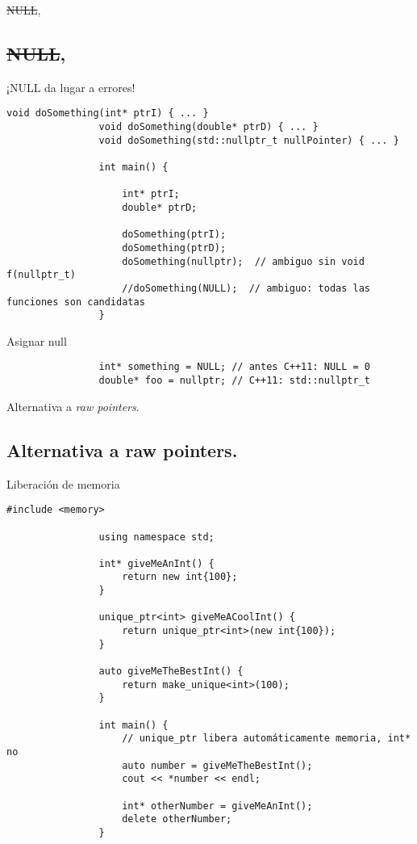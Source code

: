 \documentclass{beamer}
\newcommand{\normalSizeItem}[1] {
  \normalsize{\item #1}
}
\begin{document}
		\begin{frame}[fragile]{\sout{NULL}, }	
			\subsection{\sout{NULL}, }
			\begin{itemize}
			
				\normalSizeItem { ¡NULL da lugar a errores! }
				\begin{lstlisting}[basicstyle={\tiny\ttfamily}]
				void doSomething(int* ptrI) { ... }
				void doSomething(double* ptrD) { ... }
				void doSomething(std::nullptr_t nullPointer) { ... } 
				
				int main() {
				
					int* ptrI;
					double* ptrD;
				 
					doSomething(ptrI);
					doSomething(ptrD);
					doSomething(nullptr);  // ambiguo sin void f(nullptr_t)
					//doSomething(NULL);  // ambiguo: todas las funciones son candidatas
				}
				\end{lstlisting}
				
				\normalSizeItem { Asignar null}
				\begin{lstlisting}
				int* something = NULL; // antes C++11: NULL = 0
				double* foo = nullptr; // C++11: std::nullptr_t
				\end{lstlisting}
				
			\end{itemize}
		\end{frame}
		
		\begin{frame}[fragile]{Alternativa a \textit{raw pointers}. }	
			\subsection{Alternativa a raw pointers. }
			\begin{itemize}
			
				\normalSizeItem { Liberación de memoria }
				\begin{lstlisting}[basicstyle={\tiny\ttfamily}]
				#include <memory>
				
				using namespace std;
				
				int* giveMeAnInt() { 
					return new int{100};
				}
				
				unique_ptr<int> giveMeACoolInt() {
					return unique_ptr<int>(new int{100});
				}
				
				auto giveMeTheBestInt() {
					return make_unique<int>(100);
				}
				
				int main() {	
					// unique_ptr libera automáticamente memoria, int* no
					auto number = giveMeTheBestInt();
					cout << *number << endl;
					
					int* otherNumber = giveMeAnInt();
					delete otherNumber;
				}
				\end{lstlisting}				
			\end{itemize}
		\end{frame}
		
\end{document}
